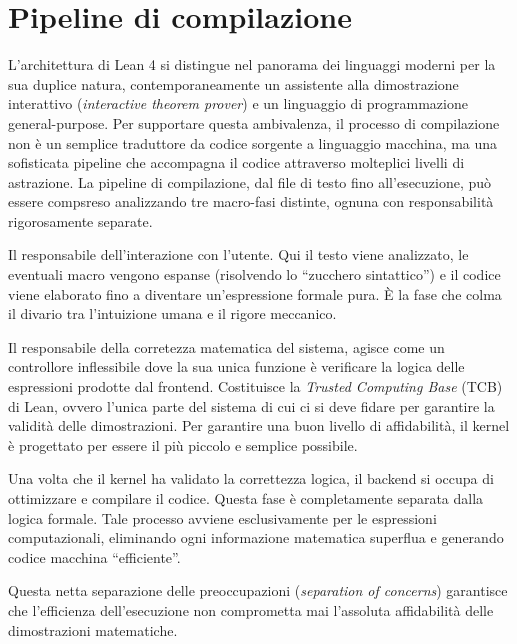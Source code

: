 \section{Pipeline di compilazione}
L'architettura di Lean 4 si distingue nel panorama dei linguaggi moderni per la sua duplice natura, contemporaneamente un assistente alla dimostrazione interattivo 
(\emph{interactive theorem prover}) e un linguaggio di programmazione general-purpose. Per supportare questa ambivalenza, il processo di compilazione non è un semplice 
traduttore da codice sorgente a linguaggio macchina, ma una sofisticata pipeline che accompagna il codice attraverso molteplici livelli di astrazione. La pipeline di 
compilazione, dal file di testo fino all'esecuzione, può essere compsreso analizzando tre macro-fasi distinte, ognuna con responsabilità rigorosamente separate. 
\begin{description}[leftmargin=1.5em, style=nextline, font=\bfseries]
    \item [Frontend]
        Il responsabile dell'interazione con l'utente. Qui il testo viene analizzato, le eventuali macro vengono espanse (risolvendo lo ``zucchero sintattico'') 
        e il codice viene elaborato fino a diventare un'espressione formale pura. È la fase che colma il divario tra l'intuizione umana e il rigore meccanico.
    \item [Kernel]
        Il responsabile della corretezza matematica del sistema, agisce come un controllore inflessibile dove la sua unica funzione è verificare la logica delle espressioni 
        prodotte dal frontend. Costituisce la \textit{Trusted Computing Base} (TCB) di Lean, ovvero l'unica parte del sistema di cui ci si deve fidare per garantire la validità 
        delle dimostrazioni. Per garantire una buon livello di affidabilità, il kernel è progettato per essere il più piccolo e semplice possibile.
    \item [Backend]
        Una volta che il kernel ha validato la correttezza logica, il backend si occupa di ottimizzare e compilare il codice. Questa fase è completamente separata dalla logica 
        formale. Tale processo avviene esclusivamente per le espressioni computazionali, eliminando ogni informazione matematica superflua e generando codice macchina ``efficiente''.
\end{description}
Questa netta separazione delle preoccupazioni (\textit{separation of concerns}) garantisce che l'efficienza dell'esecuzione non comprometta mai l'assoluta affidabilità 
delle dimostrazioni matematiche.


